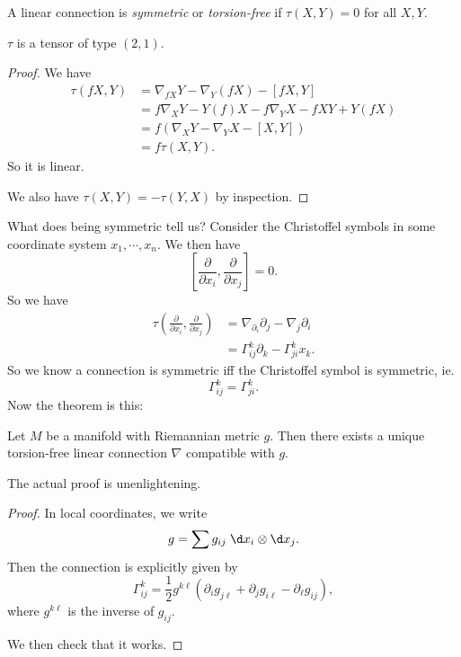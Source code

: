 \documentclass[a4paper]{article}
\begin{document}
\begin{defi}
  A linear connection is \emph{symmetric} or \emph{torsion-free} if $\tau(X, Y) = 0$ for all $X, Y$.
\end{defi}

\begin{prop}
  $\tau$ is a tensor of type $(2, 1)$.
\end{prop}

\begin{proof}
  We have
  \begin{align*}
    \tau(fX, Y) &= \nabla_{fX}Y - \nabla_Y(fX) - [fX, Y]\\
    &= f\nabla_X Y - Y(f) X - f \nabla_Y X - fXY + Y(f X)\\
    &= f(\nabla_X Y - \nabla_Y X - [X, Y])\\
    &= f \tau(X, Y).
  \end{align*}
  So it is linear.

  We also have $\tau(X, Y) = - \tau(Y, X)$ by inspection.
\end{proof}

What does being symmetric tell us? Consider the Christoffel symbols in some coordinate system $x_1, \cdots, x_n$. We then have
\[
  \left[\frac{\partial}{\partial x_i}, \frac{\partial}{\partial x_j}\right] = 0.
\]
So we have
\begin{align*}
  \tau\left(\frac{\partial}{\partial x_i}, \frac{\partial}{\partial x_j}\right) &= \nabla_{\partial_i} \partial_j - \nabla_j \partial_i\\\
  &= \Gamma_{ij}^k \partial_k - \Gamma^k_{ji} x_k.
\end{align*}
So we know a connection is symmetric iff the Christoffel symbol is symmetric, ie.
\[
  \Gamma_{ij}^k = \Gamma_{ji}^k.
\]
Now the theorem is this:
\begin{thm}
  Let $M$ be a manifold with Riemannian metric $g$. Then there exists a unique torsion-free linear connection $\nabla$ compatible with $g$.
\end{thm}

The actual proof is unenlightening.

\begin{proof}
  In local coordinates, we write
  \[
    g = \sum g_{ij} \;\d x_i \otimes \d x_j.
  \]
  Then the connection is explicitly given by
  \[
    \Gamma^k_{ij} = \frac{1}{2} g^{k\ell} (\partial_i g_{j\ell} + \partial_j g_{i\ell} - \partial_\ell g_{ij}),
  \]
  where $g^{k\ell}$ is the inverse of $g_{ij}$.

  We then check that it works.
\end{proof}
\end{document}
